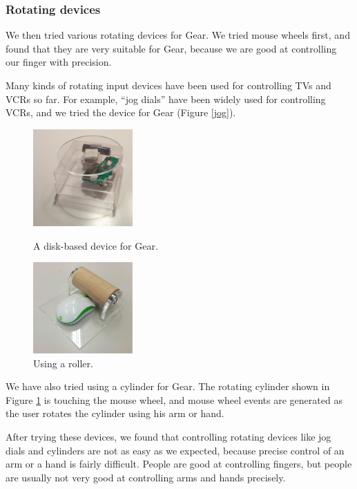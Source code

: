 \documentclass[conference]{IEEEtran}
\begin{document}
\subsubsection{Rotating devices}

We then tried various rotating devices for Gear.
%
We tried mouse wheels first, and found that they are very suitable for Gear,
because we are good at controlling our finger with precision.

Many kinds of rotating input devices have been used for controlling TVs and VCRs so far.
For example, ``jog dials'' have been widely used for controlling VCRs,
and we tried the device for Gear (Figure \ref{jog}).

\begin{figure}[H]
  \begin{minipage}{0.49\hsize}
    \centerline{\includegraphics[width=38mm,bb=0 0 362 354]{figures/ff2d18e66f9a4655dbb5e22e0bb9a0ae.png}}
    \caption{A disk-based device for Gear.}
    \label{disk}
  \end{minipage}
  \begin{minipage}{0.49\hsize}
    \centerline{\includegraphics[width=38mm,bb=0 0 1132 1039]{figures/6ff91502ea4f3f3c47840c887148ada9.png}}
    \caption{Using a roller.}
    \label{roller}
  \end{minipage}
\end{figure}

We have also tried using a cylinder for Gear.
The rotating cylinder shown in Figure \ref{roller} is touching the mouse wheel, and
mouse wheel events are generated as the user rotates the cylinder using his arm or hand.

After trying these devices, we found that controlling rotating devices
like jog dials and cylinders are not as easy as we expected,
because precise control of an arm or a hand is fairly difficult.
People are good at controlling fingers, but people are usually not very good at
controlling arms and hands precisely.
\end{document}
